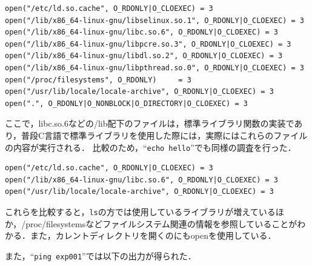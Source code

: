 \documentclass[a4j,10pt,titlepage]{jsarticle}
\begin{document}
\begin{verbatim}
open("/etc/ld.so.cache", O_RDONLY|O_CLOEXEC) = 3
open("/lib/x86_64-linux-gnu/libselinux.so.1", O_RDONLY|O_CLOEXEC) = 3
open("/lib/x86_64-linux-gnu/libc.so.6", O_RDONLY|O_CLOEXEC) = 3
open("/lib/x86_64-linux-gnu/libpcre.so.3", O_RDONLY|O_CLOEXEC) = 3
open("/lib/x86_64-linux-gnu/libdl.so.2", O_RDONLY|O_CLOEXEC) = 3
open("/lib/x86_64-linux-gnu/libpthread.so.0", O_RDONLY|O_CLOEXEC) = 3
open("/proc/filesystems", O_RDONLY)     = 3
open("/usr/lib/locale/locale-archive", O_RDONLY|O_CLOEXEC) = 3
open(".", O_RDONLY|O_NONBLOCK|O_DIRECTORY|O_CLOEXEC) = 3
\end{verbatim}

ここで，libc.so.6などの/lib配下のファイルは，標準ライブラリ関数の実装であり，普段C言語で標準ライブラリを使用した際には，実際にはこれらのファイルの内容が実行される．
比較のため，``\verb|echo hello|''でも同様の調査を行った．

\begin{verbatim}
open("/etc/ld.so.cache", O_RDONLY|O_CLOEXEC) = 3
open("/lib/x86_64-linux-gnu/libc.so.6", O_RDONLY|O_CLOEXEC) = 3
open("/usr/lib/locale/locale-archive", O_RDONLY|O_CLOEXEC) = 3
\end{verbatim}

これらを比較すると，\verb|ls|の方では使用しているライブラリが増えているほか，/proc/filesystemsなどファイルシステム関連の情報を参照していることがわかる．また，カレントディレクトリを開くのにもopenを使用している．

また，``\verb|ping exp001|''では以下の出力が得られた．
\end{document}
